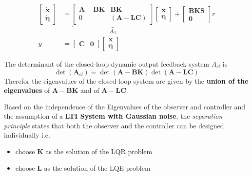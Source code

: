 \begin{align*}
    \begin{bmatrix}
        \dot{\mathbf{x}} \\
        \dot{\bm{\eta}}
    \end{bmatrix}
      & =
    \underbrace{
        \begin{bmatrix}
            \mathbf{A}-\mathbf{BK} & \mathbf{BK}               \\
            0                      & (\mathbf{A}-\mathbf{LC})
        \end{bmatrix}
    }_{A_{cl}}
    \begin{bmatrix}
        \mathbf{x} \\
        \bm{\eta}
    \end{bmatrix}
    +
    \begin{bmatrix}
        \mathbf{BKS} \\
        \mathbf{0}
    \end{bmatrix}
    r                            \\
    y & = \begin{bmatrix}
              \mathbf{C} & \mathbf{0}
          \end{bmatrix}
    \begin{bmatrix}
        \textbf{x} \\
        \bm{\eta}
    \end{bmatrix}
\end{align*}

The determinant of the closed-loop dynamic output feedback system $A_{cl}$ is
\begin{equation*}
    \det(\mathbf{A}_{cl})=\det(\mathbf{A}-\mathbf{BK})\det(\mathbf{A}-\mathbf{LC})
\end{equation*}
Therefor the eigenvalues of the closed-loop system are given by the \textbf{union of the eigenvalues} of $\mathbf{A}-\mathbf{BK}$ and of $\mathbf{A}-\mathbf{LC}$.


Based on the independence of the Eigenvalues of the observer and controller and the assumption of a \textbf{LTI System with Gaussian noise}, the \textit{separation principle} states that 
both the observer and the controller can be designed individually i.e.\
\begin{itemize}
    \item choose $\mathbf{K}$ as the solution of the LQR problem
    \item choose $\mathbf{L}$ as the solution of the LQE problem
\end{itemize}

